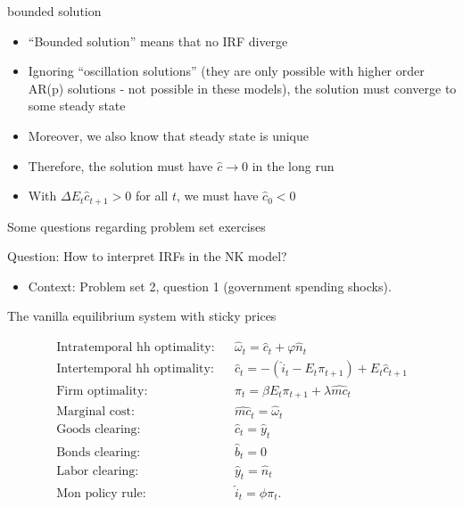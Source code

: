 \documentclass[9pt]{beamer}
\newcommand{\bit}{\begin{itemize}}
\newcommand{\eit}{\end{itemize}}
\begin{document}
\begin{frame}{bounded solution}

\bit
\setlength\itemsep{1em}
\item ``Bounded solution'' means that no IRF diverge

\item Ignoring ``oscillation solutions'' (they are only possible with higher order AR(p) solutions - not possible in these models), the solution must converge to some steady state

\item Moreover, we also know that steady state is unique

\item Therefore, the solution must have $\hat c \to 0$ in the long run

\item With $\Delta E_t \hat c_{t+1}>0$ for all $t$, we must have $\hat c_0 <0$ 

\eit


\end{frame}



\begin{frame}

\begin{center}
	\huge Some questions regarding problem set exercises \normalfont
\end{center}

\end{frame}

\begin{frame}{Question: How to interpret IRFs in the NK model?}

\bit
\setlength\itemsep{2em}
\item Context: Problem set 2, question 1 (government spending shocks).
\eit


\end{frame}


\begin{frame}{The vanilla equilibrium system with sticky prices }

\begin{eqnarray}
\text{Intratemporal hh optimality:} && \hat \omega_t = \hat c_t + \varphi \hat n_t  \nonumber \\
\text{Intertemporal hh optimality:} && \hat c_t =  - (\hat i_t - E_t \pi_{t+1}) + E_t \hat c_{t+1}  \nonumber \\
\text{Firm optimality:} && \pi_t = \beta E_t \pi_{t+1} + \lambda \widehat{mc}_t \nonumber \\
\text{Marginal cost:} && \widehat{mc}_t = \hat \omega_t \nonumber \\
\text{Goods clearing:} && \hat c_t = \hat y_t \nonumber \\
\text{Bonds clearing:} && \hat b_t = 0 \nonumber \\
\text{Labor clearing:} && \hat y_t = \hat n_t \nonumber \\
\text{Mon policy rule:} && \hat i_t = \phi \pi_t. \nonumber 
\end{eqnarray}

\end{frame}
\end{document}
